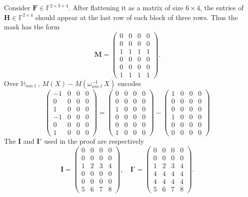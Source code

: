 \begin{example}\label{ex:second-prefix-sum}
Consider $\mathbf{F}\in\mathbb{F}^{2\times 3\times 4}$. After flattening it as
a matrix of size $6\times 4$, the entries of
$\mathbf{H}\in\mathbb{F}^{2\times 4}$ should appear at the last row of each
block of three rows. Thus the mask has the form
\[
\mathbf{M}=
\begin{pmatrix}
0&0&0&0\\
0&0&0&0\\
1&1&1&1\\
0&0&0&0\\
0&0&0&0\\
1&1&1&1
\end{pmatrix}.
\]
Over $\mathbb{H}_{nm\ell}$, $M(X) - M(\omega_{nm\ell}^{-1}X)$ encodes
\[
\begin{pmatrix}
-1&0&0&0\\
0&0&0&0\\
1&0&0&0\\
-1&0&0&0\\
0&0&0&0\\
1&0&0&0
\end{pmatrix} = 
\begin{pmatrix}
0&0&0&0\\
0&0&0&0\\
1&0&0&0\\
0&0&0&0\\
0&0&0&0\\
1&0&0&0
\end{pmatrix} - 
\begin{pmatrix}
1&0&0&0\\
0&0&0&0\\
0&0&0&0\\
1&0&0&0\\
0&0&0&0\\
0&0&0&0
\end{pmatrix}
\]
The $\mathbf{I}$ and $\mathbf{I}'$ used in the proof are respectively
\[
\mathbf{I}=
\begin{pmatrix}
0&0&0&0\\
0&0&0&0\\
1&2&3&4\\
0&0&0&0\\
0&0&0&0\\
5&6&7&8
\end{pmatrix},
\quad
\mathbf{I}'=
\begin{pmatrix}
0&0&0&0\\
0&0&0&0\\
1&2&3&4\\
4&4&4&4\\
4&4&4&4\\
5&6&7&8
\end{pmatrix}.
\]
\end{example}

